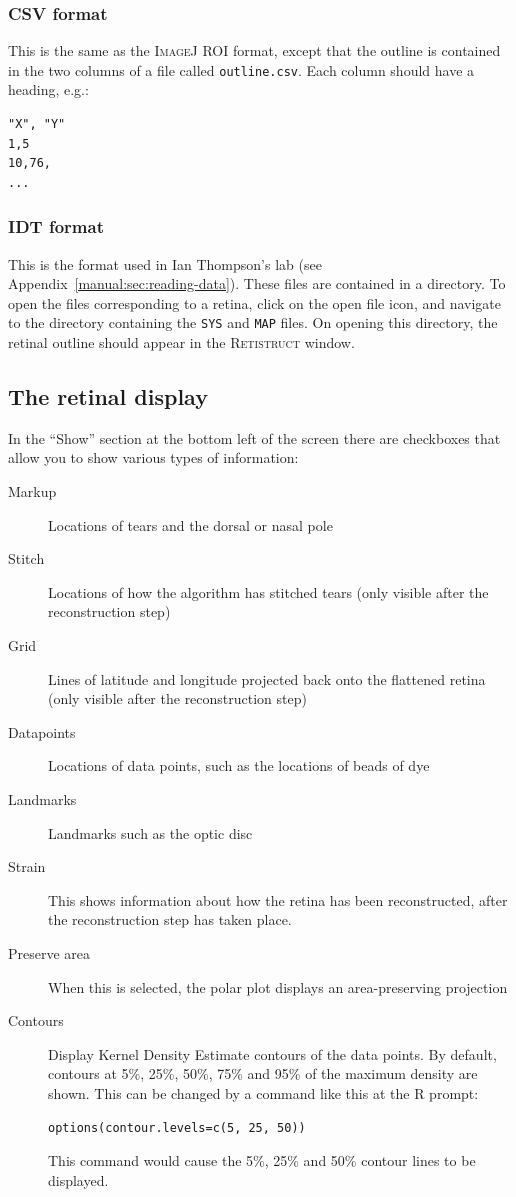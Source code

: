 \documentclass{article}
\begin{document}
\subsubsection{CSV format}
\label{retistruct-manual:sec:csv-format}

This is the same as the \textsc{ImageJ ROI} format, except that the
outline is contained in the two columns of a file called
\texttt{outline.csv}.  Each column should have a heading, e.g.:
\begin{verbatim}
"X", "Y"
1,5
10,76,
...
\end{verbatim}

\subsubsection{IDT format}
\label{retistruct-manual:sec:idt-format}

This is the format used in Ian Thompson's lab (see
Appendix~\ref{manual:sec:reading-data}). These files are contained in
a directory. To open the files corresponding to a retina, click on the
open file icon, and navigate to the directory containing the
\texttt{SYS} and \texttt{MAP} files. On opening this directory, the
retinal outline should appear in the \textsc{Retistruct} window.


\subsection{The retinal display}
\label{manual:sec:retinal-display}

In the ``Show'' section at the bottom left of the screen there are
checkboxes that allow you to show various types of information:
\begin{description}
\item[Markup] Locations of tears and the dorsal or nasal pole
\item[Stitch] Locations of how the algorithm has stitched tears (only
  visible after the reconstruction step)
\item[Grid] Lines of latitude and longitude projected back onto the
  flattened retina (only visible after the reconstruction step)
\item[Datapoints] Locations of data points, such as the locations of
  beads of dye
\item[Landmarks] Landmarks such as the optic disc
\item[Strain] This shows information about how the retina has been
  reconstructed, after the reconstruction step has taken place.
\item[Preserve area] When this is selected, the polar plot displays an
  area-preserving projection
\item[Contours] Display Kernel Density Estimate contours of the data
  points. By default, contours at 5\%, 25\%, 50\%, 75\% and 95\% of the maximum
  density are shown. This can be changed by a command like this at the
  R prompt:
\begin{verbatim}
options(contour.levels=c(5, 25, 50))
\end{verbatim}
  This command would cause the 5\%, 25\% and 50\% contour lines to be
  displayed.
\end{description}
\end{document}
